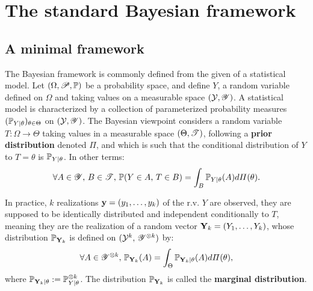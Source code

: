 

\section{The standard Bayesian framework}\label{sec:intro-ref:classical-framework}

\subsection{A minimal framework}\label{sec:intro-ref:minimalclassicframework}

The Bayesian framework is commonly defined from the given of a statistical model.
Let $(\Omega,\mathscr{P},\mathbb{P})$ be a probability space, and define $Y$, a random variable defined on $\Omega$ and taking values on a measurable space $(\mathcal{Y},\mathscr{Y})$.
A statistical model is characterized by a collection of parameterized probability measures $(\mathbb{P}_{Y|\theta})_{\theta\in\Theta}$ on $(\mathcal{Y},\mathscr{Y})$.
The Bayesian viewpoint considers a random variable $T:\Omega\to\Theta$ taking values in a measurable space $(\Theta,\mathscr{T})$, following a \textbf{prior distribution} denoted $\varPi$, and which is such that the conditional distribution of $Y$ to $T=\theta$ is $\mathbb{P}_{Y|\theta}$. In other terms:
    \begin{equation}
        \forall A\in\mathscr{Y},\,B\in\mathscr{T},\, \mathbb{P}(Y\in A,\, T\in B) = \int_B \mathbb{P}_{Y|\theta}(A) d\varPi(\theta).
    \end{equation}

In practice, $k$ realizations $\mathbf{y}= (y_1,\dots,y_k)$ of the r.v. $Y$ are observed, they are supposed to be identically distributed and independent conditionally to $T$, meaning they are the realization of a random vector $\mathbf{Y}_k = (Y_1,\dots,Y_k)$, whose distribution $\mathbb{P}_{\mathbf{Y}_k}$ is defined on $(\mathcal{Y}^k,\,\mathscr{Y}^{\otimes k})$ by:
\begin{equation}
    \forall A\in\mathscr{Y}^{\otimes k},\, \mathbb{P}_{\mathbf{Y}_k}(A) = \int_\Theta \mathbb{P}_{\mathbf{Y}_k|\theta}(A)d\varPi(\theta),
\end{equation}
where $\mathbb{P}_{\mathbf{Y}_k|\theta}:=\mathbb{P}_{Y|\theta}^{\otimes k}$. The distribution $\mathbb{P}_{\mathbf{Y}_k}$ is called the \textbf{marginal distribution}.

